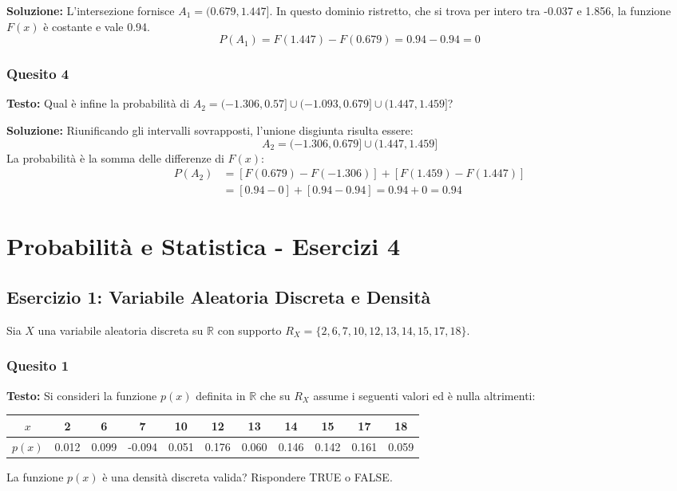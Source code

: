 \documentclass[12pt, a4paper]{article}
\begin{document}
\textbf{Soluzione:}
L'intersezione fornisce $A_1 = (0.679, 1.447]$. In questo dominio ristretto, che si trova per intero tra -0.037 e 1.856, la funzione $F(x)$ è costante e vale 0.94.
$$P(A_1) = F(1.447) - F(0.679) = 0.94 - 0.94 = 0$$

\subsubsection*{Quesito 4}
\textbf{Testo:} Qual è infine la probabilità di $A_2 = (-1.306, 0.57] \cup (-1.093, 0.679] \cup (1.447, 1.459]$?

\textbf{Soluzione:}
Riunificando gli intervalli sovrapposti, l'unione disgiunta risulta essere:
$$A_2 = (-1.306, 0.679] \cup (1.447, 1.459]$$
La probabilità è la somma delle differenze di $F(x)$:
\begin{align*}
P(A_2) &= [F(0.679) - F(-1.306)] + [F(1.459) - F(1.447)] \\
&= [0.94 - 0] + [0.94 - 0.94] = 0.94 + 0 = 0.94
\end{align*}


\section*{Probabilità e Statistica - Esercizi 4}

\subsection*{Esercizio 1: Variabile Aleatoria Discreta e Densità}
Sia $X$ una variabile aleatoria discreta su $\mathbb{R}$ con supporto $R_X = \{2, 6, 7, 10, 12, 13, 14, 15, 17, 18\}$.

\subsubsection*{Quesito 1}
\textbf{Testo:} Si consideri la funzione $p(x)$ definita in $\mathbb{R}$ che su $R_X$ assume i seguenti valori ed è nulla altrimenti:
\begin{center}
\begin{tabular}{c|cccccccccc}
\toprule
$x$ & 2 & 6 & 7 & 10 & 12 & 13 & 14 & 15 & 17 & 18 \\
\midrule
$p(x)$ & 0.012 & 0.099 & -0.094 & 0.051 & 0.176 & 0.060 & 0.146 & 0.142 & 0.161 & 0.059 \\
\bottomrule
\end{tabular}
\end{center}
La funzione $p(x)$ è una densità discreta valida? Rispondere TRUE o FALSE.
\end{document}
